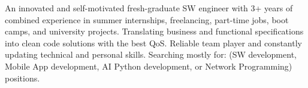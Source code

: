 

\begin{cvparagraph}

{\scriptsize  An innovated and self-motivated fresh-graduate SW engineer with 3+ years of combined experience in summer internships, freelancing, part-time jobs, boot camps, and university projects. Translating business and functional specifications into clean code solutions with the best QoS. Reliable team player and constantly updating technical and personal skills. Searching mostly for: (SW development, Mobile App development, AI Python development, or Network Programming) positions.} 
\end{cvparagraph}